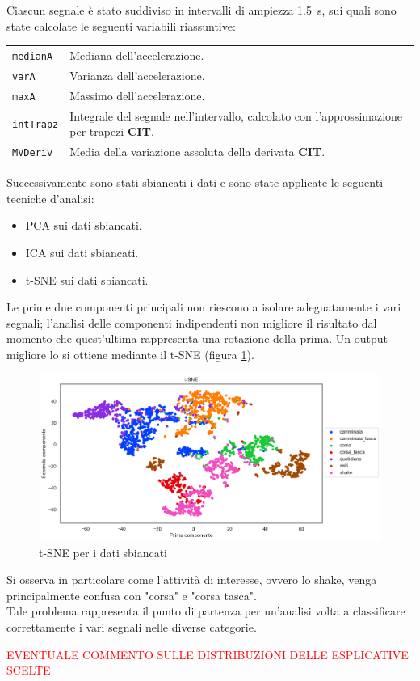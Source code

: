 \documentclass[./main.tex]{subfiles}
\begin{document}
Ciascun segnale è stato suddiviso in intervalli di ampiezza \SI{1.5}{s}, sui quali sono state calcolate le seguenti variabili riassuntive:
\begin{table}[H]
	\begin{tabular}{ll}
		\texttt{medianA}& Mediana dell'accelerazione.\\
		\texttt{varA}& Varianza dell'accelerazione.\\
		\texttt{maxA}& Massimo dell'accelerazione.\\
		\texttt{intTrapz}& Integrale del segnale nell'intervallo, calcolato con l'approssimazione per trapezi \textbf{CIT}.\\
		\texttt{MVDeriv}& Media della variazione assoluta della derivata \textbf{CIT}.
	\end{tabular}
\end{table}
Successivamente sono stati sbiancati i dati e sono state applicate le seguenti tecniche d'analisi:
\begin{itemize}
	\item PCA sui dati sbiancati.
	\item ICA sui dati sbiancati.
	\item t-SNE sui dati sbiancati.
\end{itemize}
Le prime due componenti principali non riescono a isolare adeguatamente i vari segnali; l'analisi delle componenti indipendenti non migliore il risultato dal momento che quest'ultima rappresenta una rotazione della prima. Un output migliore lo si ottiene mediante il t-SNE (figura \ref{t-sne}). 
\begin{figure}[H]
	\centering
	\includegraphics[width=.8\textwidth, keepaspectratio]{../../figure/t-SNE.png}
	\caption{{ t-SNE per i dati sbiancati}}
	\label{t-sne}
\end{figure}
Si osserva in particolare come l'attività di interesse, ovvero lo shake, venga principalmente confusa con "corsa" e "corsa tasca". 
\\
Tale problema rappresenta il punto di partenza per un'analisi volta a classificare correttamente i vari segnali nelle diverse categorie.

\textcolor{red}{EVENTUALE COMMENTO SULLE DISTRIBUZIONI DELLE ESPLICATIVE SCELTE}
\end{document}
